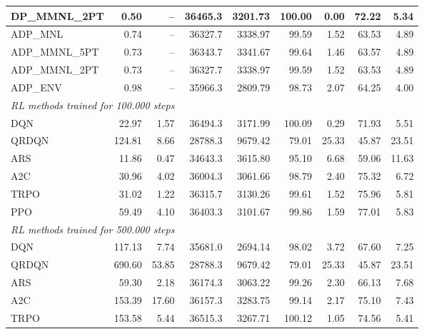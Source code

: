 \begin{samepage}
\begin{center}
\begin{tabular}{l|rr|rr|rr|rr}
    DP\_MMNL\_2PT &     0.50 &    -- &    36465.3 &    3201.73 &  100.00 &    0.00 &   72.22 &    5.34 \\
    \midrule
    ADP\_MNL     &     0.74 &    -- &    36327.7 &    3338.97 &   99.59 &    1.52 &   63.53 &    4.89 \\
    ADP\_MMNL\_5PT &     0.73 &    -- &    36343.7 &    3341.67 &   99.64 &    1.46 &   63.57 &    4.89 \\
    ADP\_MMNL\_2PT &     0.73 &    -- &    36327.7 &    3338.97 &   99.59 &    1.52 &   63.53 &    4.89 \\
    ADP\_ENV     &     0.98 &    -- &    35966.3 &    2809.79 &   98.73 &    2.07 &   64.25 &    4.00 \\
    \midrule
    \multicolumn{9}{l}{\textit{RL methods trained for 100.000 steps}} \\
    \midrule
    DQN          &    22.97 &     1.57 &    36494.3 &    3171.99 &  100.09 &    0.29 &   71.93 &    5.51 \\
    QRDQN        &   124.81 &     8.66 &    28788.3 &    9679.42 &   79.01 &   25.33 &   45.87 &   23.51 \\
    ARS          &    11.86 &     0.47 &    34643.3 &    3615.80 &   95.10 &    6.68 &   59.06 &   11.63 \\
    A2C          &    30.96 &     4.02 &    36004.3 &    3061.66 &   98.79 &    2.40 &   75.32 &    6.72 \\
    TRPO         &    31.02 &     1.22 &    36315.7 &    3130.26 &   99.61 &    1.52 &   75.96 &    5.81 \\
    PPO          &    59.49 &     4.10 &    36403.3 &    3101.67 &   99.86 &    1.59 &   77.01 &    5.83 \\
    \midrule
    \multicolumn{9}{l}{\textit{RL methods trained for 500.000 steps}} \\
    \midrule
    DQN          &   117.13 &     7.74 &    35681.0 &    2694.14 &   98.02 &    3.72 &   67.60 &    7.25 \\
    QRDQN        &   690.60 &    53.85 &    28788.3 &    9679.42 &   79.01 &   25.33 &   45.87 &   23.51 \\
    ARS          &    59.30 &     2.18 &    36174.3 &    3063.22 &   99.26 &    2.30 &   66.13 &    7.68 \\
    A2C          &   153.39 &    17.60 &    36157.3 &    3283.75 &   99.14 &    2.17 &   75.10 &    7.43 \\
    TRPO         &   153.58 &     5.44 &    36515.3 &    3267.71 &  100.12 &    1.05 &   74.56 &    5.41 \\

\end{tabular}
\end{center}
\end{samepage}
